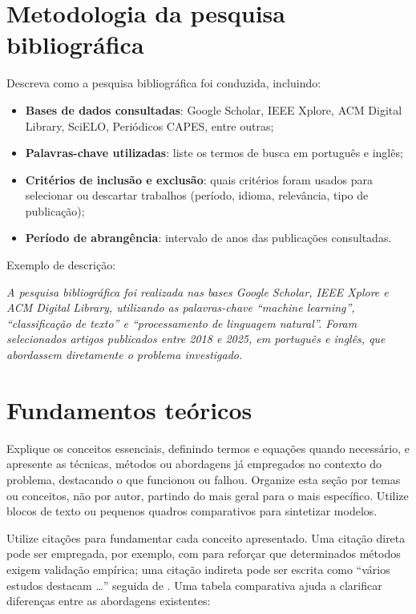 \documentclass[
    12pt,                %
    openright,           %
    oneside,             %
    a4paper,             %
    english,             %
    brazil               %
]{abntex2}
\begin{document}
\section{Metodologia da pesquisa bibliográfica}
\label{sec:metodologia_pesquisa_bib}

Descreva como a pesquisa bibliográfica foi conduzida, incluindo:

\begin{itemize}
    \item \textbf{Bases de dados consultadas}: Google Scholar, IEEE Xplore, ACM Digital Library, SciELO, Periódicos CAPES, entre outras;
    \item \textbf{Palavras-chave utilizadas}: liste os termos de busca em português e inglês;
    \item \textbf{Critérios de inclusão e exclusão}: quais critérios foram usados para selecionar ou descartar trabalhos (período, idioma, relevância, tipo de publicação);
    \item \textbf{Período de abrangência}: intervalo de anos das publicações consultadas.
\end{itemize}

Exemplo de descrição:

\textit{A pesquisa bibliográfica foi realizada nas bases Google Scholar, IEEE Xplore e ACM Digital Library, utilizando as palavras-chave ``machine learning'', ``classificação de texto'' e ``processamento de linguagem natural''. Foram selecionados artigos publicados entre 2018 e 2025, em português e inglês, que abordassem diretamente o problema investigado.}

\section{Fundamentos teóricos}
\label{sec:fundamentos}

Explique os conceitos essenciais, definindo termos e equações quando necessário, e apresente as técnicas, métodos ou abordagens já empregados no contexto do problema, destacando o que funcionou ou falhou. Organize esta seção por temas ou conceitos, não por autor, partindo do mais geral para o mais específico. Utilize blocos de texto ou pequenos quadros comparativos para sintetizar modelos.

Utilize citações para fundamentar cada conceito apresentado. Uma citação direta pode ser empregada, por exemplo, com  para reforçar que determinados métodos exigem validação empírica; uma citação indireta pode ser escrita como ``vários estudos destacam \ldots'' seguida de \cite{Wazlawick2020}. Uma tabela comparativa ajuda a clarificar diferenças entre as abordagens existentes:
\end{document}
